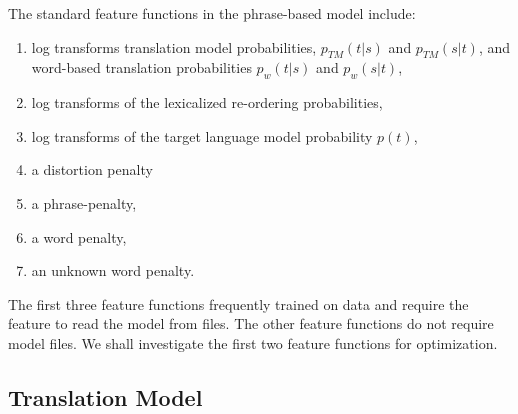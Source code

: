 \documentclass[11pt]{article}
\begin{document}
The standard feature functions in the phrase-based model include:
\begin{enumerate}
  \item log transforms translation model probabilities, $p_{TM}(t|s) $ and $p_{TM}(s|t)$, and word-based translation probabilities $p_w(t|s)$ and $p_w(s|t)$,
  \item log transforms of the lexicalized re-ordering probabilities,
  \item log transforms of the target language model probability $p(t)$, 
  \item a distortion penalty
  \item a phrase-penalty,
  \item a word penalty,
  \item an unknown word penalty.
\end{enumerate}

The first three feature functions frequently trained on data and require the feature to read the model from files. The other feature functions do not require model files. We shall investigate the first two feature functions for optimization.

%
\subsection{Translation Model}
\end{document}
